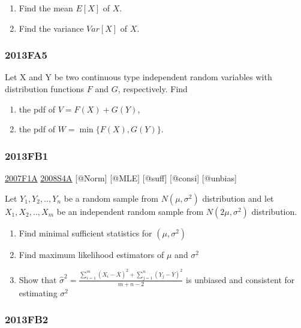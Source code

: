 \documentclass[6pt,Portrait]{article}
\begin{document}
\begin{enumerate}
\def\labelenumi{(\alph{enumi})}
\item
  Find the mean \(E[X]\) of \(X\).
\item
  Find the variance \(Var[X]\) of \(X\).
\end{enumerate}

\hypertarget{fa5}{%
\subsubsection{2013FA5}\label{fa5}}

Let X and Y be two continuous type independent random variables with
distribution functions \(F\) and \(G\), respectively. Find

\begin{enumerate}
\def\labelenumi{(\alph{enumi})}
\item
  the pdf of \(V=F(X)+G(Y)\),
\item
  the pdf of \(W=\min\{F(X),G(Y)\}\).
\end{enumerate}

\hypertarget{fb1-2}{%
\subsubsection{2013FB1}\label{fb1-2}}

\protect\hyperlink{f1a}{2007F1A} \protect\hyperlink{s4a}{2008S4A}
{[}@Norm{]} {[}@MLE{]} {[}@suff{]} {[}@consi{]} {[}@unbias{]}

Let \(Y_1,Y_2,..,Y_{n}\) be a random sample from \(N(\mu,\sigma^2)\)
distribution and let \(X_1,X_2,..,X_{m}\) be an independent random
sample from \(N(2\mu,\sigma^2)\) distribution.

\begin{enumerate}
\def\labelenumi{(\alph{enumi})}
\item
  Find minimal sufficient statistics for \((\mu,\sigma^2)\)
\item
  Find maximum likelihood estimators of \(\mu\) and \(\sigma^2\)
\item
  Show that
  \(\hat\sigma^2=\frac{\sum_{i=1}^m(X_i-\bar X)^2+\sum_{j=1}^n(Y_j-\bar Y)^2}{m+n-2}\)
  is unbiased and consistent for estimating \(\sigma^2\)
\end{enumerate}

\hypertarget{fb2-2}{%
\subsubsection{2013FB2}\label{fb2-2}}
\end{document}
